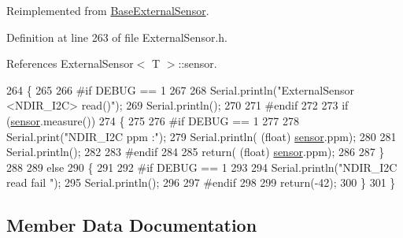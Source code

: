 Reimplemented from \hyperlink{classBaseExternalSensor_a1564f16deacf57b51b9948ac29db4291}{Base\+External\+Sensor}.



Definition at line 263 of file External\+Sensor.\+h.



References External\+Sensor$<$ T $>$\+::sensor.


\begin{DoxyCode}
264     \{
265         
266 \textcolor{preprocessor}{    #if DEBUG == 1 }
267         
268         Serial.println(\textcolor{stringliteral}{"ExternalSensor <NDIR\_I2C> read()"});
269         Serial.println();
270 
271 \textcolor{preprocessor}{    #endif}
272 
273         \textcolor{keywordflow}{if} (\hyperlink{classExternalSensor_3_01NDIR__I2C_01_4_ae541c9cece7c38674b70114cdb74a7dc}{sensor}.measure())
274         \{
275         
276 \textcolor{preprocessor}{        #if DEBUG == 1 }
277 
278             Serial.print(\textcolor{stringliteral}{"NDIR\_I2C ppm :"});
279             Serial.println( (\textcolor{keywordtype}{float}) \hyperlink{classExternalSensor_3_01NDIR__I2C_01_4_ae541c9cece7c38674b70114cdb74a7dc}{sensor}.ppm);
280             
281             Serial.println();           
282 
283 \textcolor{preprocessor}{        #endif}
284 
285             \textcolor{keywordflow}{return}( (\textcolor{keywordtype}{float}) \hyperlink{classExternalSensor_3_01NDIR__I2C_01_4_ae541c9cece7c38674b70114cdb74a7dc}{sensor}.ppm);
286             
287         \}
288         
289         \textcolor{keywordflow}{else}
290         \{
291         
292 \textcolor{preprocessor}{        #if DEBUG == 1 }
293 
294             Serial.println(\textcolor{stringliteral}{"NDIR\_I2C read fail "});
295             Serial.println();
296         
297 \textcolor{preprocessor}{        #endif}
298 
299             \textcolor{keywordflow}{return}(-42);
300         \}
301     \}
\end{DoxyCode}


\subsection{Member Data Documentation}
\mbox{\label{classExternalSensor_3_01NDIR__I2C_01_4_ae541c9cece7c38674b70114cdb74a7dc}} 
